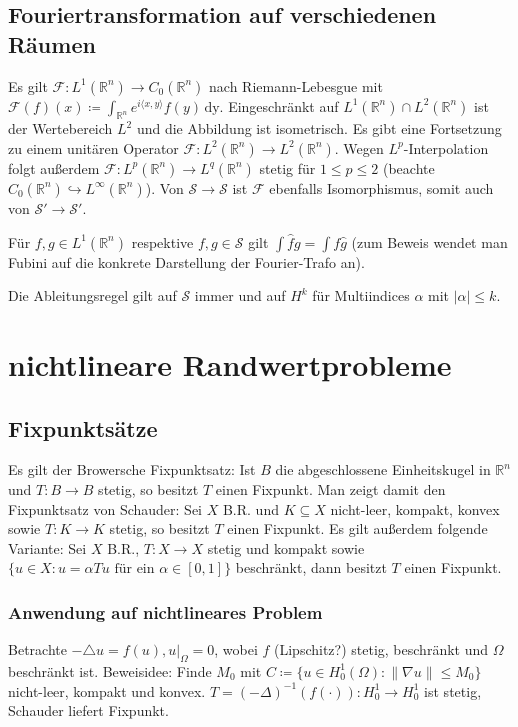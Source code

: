 \documentclass[11pt,a4paper]{scrartcl}
\newcommand{\R}{\mathbb{R}} %
\newcommand{\Sc}{\mathcal{S}}
\newcommand{\F}{\mathcal{F}}
\newcommand{\laplace}{\triangle}
\theoremstyle{plain}
\theoremstyle{definition}
\theoremstyle{remark}
\begin{document}
\subsection{Fouriertransformation auf verschiedenen Räumen}

Es gilt $\F: L^1(\R^n) \to C_0(\R^n)$ nach Riemann-Lebesgue mit $\F(f)(x)\coloneqq \int_{\R^n} e^{i\langle x,y \rangle}f(y) \, \mathrm{dy}$. Eingeschränkt auf $L^1(\R^n) \cap L^2(\R^n)$ ist der Wertebereich $L^2$ und die Abbildung ist isometrisch. Es gibt eine Fortsetzung zu einem unitären Operator $\F: L^2(\R^n)\to L^2(\R^n)$. Wegen $L^p$-Interpolation folgt außerdem $\F: L^p(\R^n)\to L^q(\R^n)$ stetig für $1 \leq p \leq 2$ (beachte $C_0(\R^n) \hookrightarrow L^\infty(\R^n)$). Von $\Sc\to \Sc$ ist $\F$ ebenfalls Isomorphismus, somit auch von $\Sc'\to \Sc'$.

Für $f,g\in L^1(\R^n)$ respektive $f,g\in \Sc$ gilt $\int \hat f g = \int f \hat g$ (zum Beweis wendet man Fubini auf die konkrete Darstellung der Fourier-Trafo an).

Die Ableitungsregel gilt auf $\Sc$ immer und auf $H^k$ für Multiindices $\alpha$ mit $|\alpha| \leq k$.

\section{nichtlineare Randwertprobleme}

\subsection{Fixpunktsätze}

Es gilt der Browersche Fixpunktsatz: Ist $B$ die abgeschlossene Einheitskugel in $\R^n$ und $T:B\to B$ stetig, so besitzt $T$ einen Fixpunkt. Man zeigt damit den Fixpunktsatz von Schauder: Sei $X$ B.R. und $K\subseteq X$ nicht-leer, kompakt, konvex sowie $T:K\to K$ stetig, so besitzt $T$ einen Fixpunkt. Es gilt außerdem folgende Variante: Sei $X$ B.R., $T:X\to X$ stetig und kompakt sowie $\{ u\in X: u = \alpha Tu \text{ für ein } \alpha \in [0,1]\}$ beschränkt, dann besitzt $T$ einen Fixpunkt.

\subsubsection{Anwendung auf nichtlineares Problem}

Betrachte $-\laplace u = f(u), u|_\Omega = 0$, wobei $f$ (Lipschitz?) stetig, beschränkt und $\Omega$ beschränkt ist. Beweisidee: Finde $M_0$ mit $C\coloneqq \{ u\in H^1_0(\Omega): \|\nabla u\| \leq M_0\}$ nicht-leer, kompakt und konvex. $T = (-\Delta)^{-1}(f(\cdot)): H^1_0\to H^1_0$ ist stetig, Schauder liefert Fixpunkt.
\end{document}
